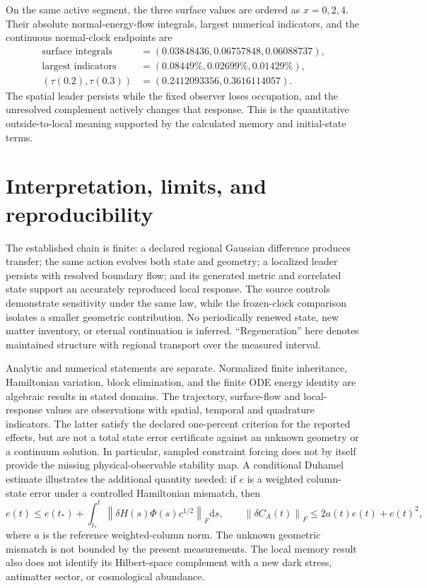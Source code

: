 \documentclass[11pt]{article}
\newcommand{\dd}{\mathrm{d}}
\newcommand{\norm}[1]{\left\lVert#1\right\rVert}
\begin{document}
On the same active segment, the three surface values are ordered as
$x=0,2,4$. Their absolute normal-energy-flow integrals, largest numerical
indicators, and the continuous normal-clock endpoints are
\begin{align*}
\text{surface integrals}&=(0.03848436,0.06757848,0.06088737),\\
\text{largest indicators}&=(0.08449\%,0.02699\%,0.01429\%),\\
(\tau(0.2),\tau(0.3))&=(0.2412093356,0.3616114057).
\end{align*}
The spatial leader persists while the fixed observer loses
occupation, and the unresolved complement actively changes that response.
This is the quantitative outside-to-local meaning supported by the
calculated memory and initial-state terms.

\section{Interpretation, limits, and reproducibility}\label{sec:scope}
The established chain is finite: a declared regional Gaussian difference
produces transfer; the same action evolves both state and geometry;
a localized leader persists with resolved boundary flow; and its generated
metric and correlated state support an accurately reproduced local response.
The source controls demonstrate sensitivity under the same law, while the
frozen-clock comparison isolates a smaller geometric contribution.
No periodically renewed state, new matter inventory, or eternal continuation
is inferred. ``Regeneration'' here denotes maintained structure with
regional transport over the measured interval.

Analytic and numerical statements are separate. Normalized finite
inheritance, Hamiltonian variation, block elimination, and the finite ODE
energy identity are algebraic results in stated domains. The trajectory,
surface-flow and local-response values are observations with spatial,
temporal and quadrature indicators. The latter satisfy the declared
one-percent criterion for the reported effects, but are not a total state
error certificate against an unknown geometry or a continuum solution.
In particular, sampled constraint forcing does not by itself provide the
missing physical-observable stability map.
A conditional Duhamel estimate illustrates the additional quantity needed:
if $e$ is a weighted column-state error under a controlled Hamiltonian
mismatch, then
\begin{equation}\label{eq:duhamel}
e(t)\le e(t_*)+\int_{t_*}^t\norm{\delta H(s)\Phi(s)c^{1/2}}_F\dd s,\qquad
\norm{\delta C_A(t)}_F\le2a(t)e(t)+e(t)^2,
\end{equation}
where $a$ is the reference weighted-column norm. The unknown geometric
mismatch is not bounded by the present measurements.
The local memory result also does not identify its Hilbert-space complement
with a new dark stress, antimatter sector, or cosmological abundance.
\end{document}
